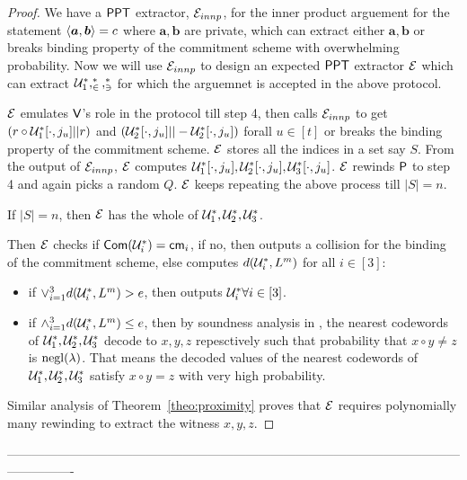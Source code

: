 \begin{proof}
	We have a $\mathsf{PPT}$ extractor, $\mathcal{E}_{innp}$, for the inner product arguement for the statement $\langle \bm{a},\bm{b}\rangle=c$ where $\bm{a},\bm{b}$ are private, which can extract either $\bm{a}, \bm{b}$ or breaks binding property of the commitment scheme with overwhelming probability. Now we will use $\mathcal{E}_{innp}$ to design an expected $\mathsf{PPT}$ extractor $\mathcal{E}$ which can extract $\mathcal{U}^*_1, \cal^*_2, \cal^*_3$ for which the arguemnet is accepted in the above protocol.
	
	$\mathcal{E}$ emulates $\mathsf{V}$'s role in the protocol till step 4, then calls $\mathcal{E}_{innp}$ to get $(r\circ \mathcal{U}^*_1[\cdot,j_u]||r)$ and $(\mathcal{U}^*_2[\cdot,j_u]||-\mathcal{U}^*_2[\cdot,j_u])$ forall $u\in [t]$ or breaks the binding property of the commitment scheme. $\mathcal{E}$ stores all the indices in a set say $S$. From the output of $\mathcal{E}_{innp}$, $\mathcal{E}$ computes $\mathcal{U}^*_1[\cdot,j_u], \mathcal{U}^*_2[\cdot,j_u],\mathcal{U}^*_3[\cdot,j_u]$. $\mathcal{E}$ rewinds $\mathsf{P}$ to step 4 and again picks a random $Q$. $\mathcal{E}$ keeps repeating the above process till $|S|=n$.
	
	If $|S|=n$, then $\mathcal{E}$ has the whole of $\mathcal{U}^*_1, \mathcal{U}^*_2, \mathcal{U}^*_3$.
	
	Then $\mathcal{E}$ checks if $\mathsf{Com}(\mathcal{U}^*_i)=\mathsf{cm}_i$, if no, then outputs a collision for the binding of the commitment scheme, else computes $d(\mathcal{U}^*_i, L^m)$ for all $i \in [3]$:
	
	\begin{itemize}
		\item if $\vee_{i=1}^{3} d(\mathcal{U}^*_i, L^m) > e$, then outputs $\mathcal{U}^*_i \forall i\in [3]$.
		
		\item if $\wedge_{i=1}^3 d(\mathcal{U}^*_i, L^m) \leq e$, then by soundness analysis in \cite{Ligero2017}, the nearest codewords of $\mathcal{U}^*_1, \mathcal{U}^*_2, \mathcal{U}^*_3$ decode to $x, y, z$ repesctively such that probability that $x \circ y \neq z$ is $\mathrm{negl}(\lambda)$. That means the decoded values of the nearest codewords of $\mathcal{U}^*_1, \mathcal{U}^*_2, \mathcal{U}^*_3$ satisfy $x\circ y = z$ with very high probability.
	\end{itemize}
	
	Similar analysis of Theorem~\ref{theo:proximity} proves that $\mathcal{E}$ requires polynomially many rewinding to extract the witness $x, y, z$.
\end{proof}

----------------------------------------------------------------------------------------------------------------------------




